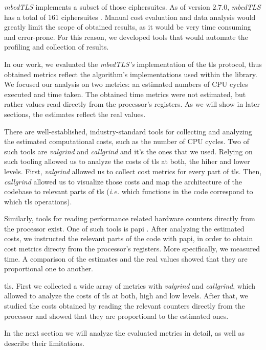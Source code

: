 \textit{mbedTLS} implements a subset of those ciphersuites. As of version $2.7.0$, \textit{mbedTLS}
has a total of $161$ ciphersuites \cite{mbedTLS_ciphers_list:online}. Manual cost evaluation and
data analysis would greatly limit the scope of obtained results, as it would be very time consuming
and error-prone. For this reason, we developed tools that would automate the profiling and collection
of results.

In our work, we evaluated the \textit{mbedTLS's} implementation of the \gls{tls} protocol, thus obtained
metrics reflect the algorithm's implementations used within the library. 
We focused our analysis on two metrics: an estimated numbers of CPU cycles executed and time taken.
The obtained time metrics were not estimated, but rather values read directly from the processor's registers.
As we will show in later sections, the estimates reflect the real values.

There are well-established, industry-standard tools for collecting and analyzing the estimated computational costs,
such as the number of CPU cycles. Two of such tools are \textit{valgrind} and \textit{callgrind} and it's the ones that we used. 
Relying on such tooling allowed us to analyze the costs of \gls{tls} at both, the hiher and lower levels.
First, \textit{valgrind} allowed us to collect cost metrics for every part of \gls{tls}. Then, \textit{callgrind}
allowed us to visualize those costs and map the architecture of the codebase to relevant parts of \gls{tls} (\textit{i.e.}
which functions in the code correspond to which \gls{tls} operations).

Similarly, tools for reading performance related hardware counters directly from the processor exist. 
One of such tools is \gls{papi} \cite{dongarra2001using}.
After analyzing the estimated costs, we instructed the relevant parts of the code with \gls{papi}, in order to obtain
cost metrics directy from the processor's registers. More specifically, we measured time. A comparison of the estimates
and the real values showed that they are proportional one to another. 

\gls{tls}. First we collected a wide array of metrics with \textit{valgrind} and \textit{callgrind}, which allowed to
analyze the costs of \gls{tls} at both, high and low levels. After that, we studied the costs obtained by reading
the relevant counters directly from the processor and showed that they are proportional to the estimated ones.

In the next section we will analyze the evaluated metrics in detail, as well as describe their limitations.

